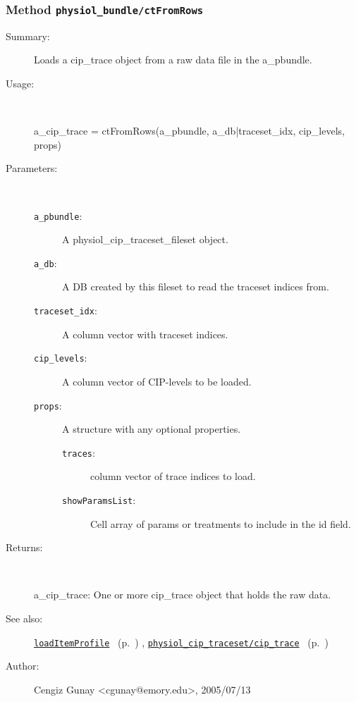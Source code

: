 \subsubsection[Method \texttt{ctFromRows}]{Method \texttt{physiol\_bundle/ctFromRows}}%
%
\label{ref_physiol_bundle__ctFromRows}%
\hypertarget{ref_physiol_bundle__ctFromRows}{}%
\begin{description}
\item[Summary:]Loads a cip\_trace object from a raw data file in the a\_pbundle.
%
\item[Usage:]~%
\begin{lyxcode}%
a\_cip\_trace = ctFromRows(a\_pbundle, a\_db|traceset\_idx, cip\_levels, props)
%
\end{lyxcode}%
%
%
\item[Parameters:]~
\begin{description}%
\item[\texttt{a\_pbundle}:]
 A physiol\_cip\_traceset\_fileset object.
\item[\texttt{a\_db}:]
 A DB created by this fileset to read the traceset indices from.
\item[\texttt{traceset\_idx}:]
 A column vector with traceset indices.
\item[\texttt{cip\_levels}:]
 A column vector of CIP-levels to be loaded.
\item[\texttt{props}:]
 A structure with any optional properties.
\begin{description}%
\item[\texttt{traces}:]
 column vector of trace indices to load.
\item[\texttt{showParamsList}:]
 Cell array of params or treatments to include in the id field.
\end{description}%
\end{description}%
%
\item[Returns:
]~

	a\_cip\_trace: One or more cip\_trace object that holds the raw data.
%
%
\item[See also:]%
\hyperlink{ref_loadItemProfile}{\texttt{loadItemProfile}}%
\ (p.~\pageref{ref_loadItemProfile})%
%
, \hyperlink{ref_physiol_cip_traceset__cip_trace}{\texttt{physiol\_cip\_traceset/cip\_trace}}%
\ (p.~\pageref{ref_physiol_cip_traceset__cip_trace})%
%
%
\item[Author:]%
Cengiz Gunay <cgunay@emory.edu>, 2005/07/13
%
\end{description}
\methodline%
